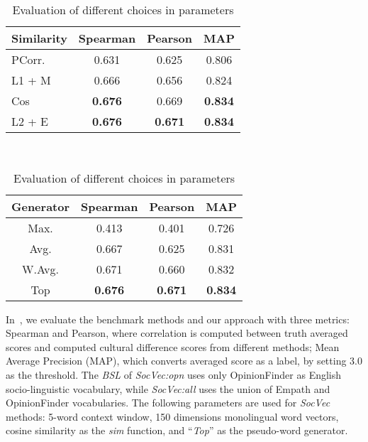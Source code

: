 \begin{table}[t]
	\centering
\begin{subtable}{0.45\linewidth}
	\centering
	\scriptsize
	\begin{tabular}{l|c|c|c}
		\textbf{Similarity} & \textbf{Spearman} & \textbf{Pearson}   & \textbf{MAP} \\ \hline
		PCorr. & 0.631 & 0.625 & 0.806\\ 
		L1 + M & 0.666 & 0.656 & 0.824 \\  
		Cos & \textbf{0.676} & 0.669 & \textbf{0.834} \\ 
		L2 + E & \textbf{0.676} & \textbf{0.671} & \textbf{0.834} \\ \hline
	\end{tabular}
	\caption{Evaluation of Different Similarity Functions}
\label{tab:mcdne_res_2}
\end{subtable}
~~
\begin{subtable}{0.45\linewidth}
	\centering
	\scriptsize
	\begin{tabular}{c|c|c|c}
		\textbf{Generator} & \textbf{Spearman} & \textbf{Pearson}   & \textbf{MAP} \\  \hline
		Max. & 0.413 & 0.401 & 0.726\\ 
		Avg. & 0.667 & 0.625 & 0.831\\ 
		W.Avg. & 0.671 & 0.660 & 0.832 \\  
		Top & \textbf{0.676} & \textbf{0.671} & \textbf{0.834} \\ \hline
	\end{tabular}
	\caption{Evaluation of Different Pseudo-word Generators}
\label{tab:mcdne_res_3}
\end{subtable}
\caption{Evaluation of different choices in parameters}
\end{table}

In~, we evaluate the benchmark methods and our approach with three metrics: Spearman and 
Pearson, where correlation is computed between truth averaged scores and computed cultural difference scores from different methods; Mean Average Precision (MAP), which converts averaged score as a label, by setting 3.0 as the threshold. 
The \textit{BSL} of \textit{SocVec:opn} uses only OpinionFinder as English socio-linguistic vocabulary, while \textit{SocVec:all} uses the union of Empath and OpinionFinder vocabularies. 
The following parameters are used for \textit{SocVec} methods: 5-word context window,
150 dimensions monolingual word vectors, cosine similarity as the \textit{sim} function, 
and ``\textit{Top}'' as the pseudo-word generator.

